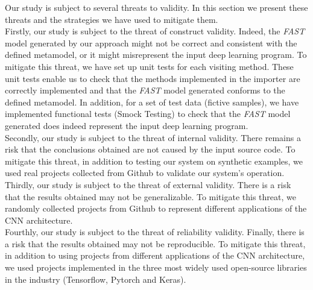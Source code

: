 \label{sec:threats}
Our study is subject to several threats to validity. In this section we present these threats and the strategies we have used to mitigate them.\\

Firstly, our study is subject to the threat of construct validity. Indeed, the \emph{FAST} model generated by our approach might not be correct and consistent with the defined metamodel, or it might misrepresent the input deep learning program. To mitigate this threat, we have set up unit tests for each visiting method. These unit tests enable us to check that the methods implemented in the importer are correctly implemented and that the \emph{FAST} model generated conforms to the defined metamodel. In addition, for a set of test data (fictive samples), we have implemented functional tests (Smock Testing) to check that the \emph{FAST} model generated does indeed represent the input deep learning program.\\

Secondly, our study is subject to the threat of internal validity. There remains a risk that the conclusions obtained are not caused by the input source code. To mitigate this threat, in addition to testing our system on synthetic examples, we used real projects collected from Github to validate our system's operation.\\

Thirdly, our study is subject to the threat of external validity. There is a risk that the results obtained may not be generalizable. To mitigate this threat, we randomly collected projects from Github to represent different applications of the CNN architecture.\\

Fourthly, our study is subject to the threat of reliability validity. Finally, there is a risk that the results obtained may not be reproducible. To mitigate this threat, in addition to using projects from different applications of the CNN architecture, we used projects implemented in the three most widely used open-source libraries in the industry (Tensorflow, Pytorch and Keras).